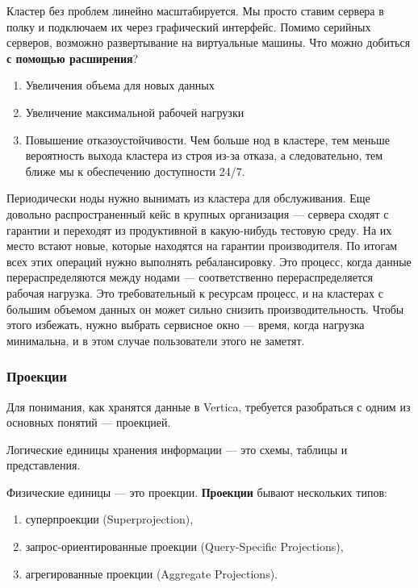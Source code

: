Кластер без проблем линейно масштабируется. Мы просто ставим сервера
в полку и
подключаем их через графический интерфейс. Помимо серийных серверов,
возможно развертывание на виртуальные машины. Что можно добиться \textbf{с помощью
расширения}?

\begin{enumerate}
	\item Увеличения объема для новых данных
	\item Увеличение максимальной рабочей нагрузки
	\item Повышение отказоустойчивости. Чем больше нод в кластере, тем меньше
	вероятность
	выхода кластера из строя из-за отказа, а следовательно, тем ближе мы к
	обеспечению
	доступности 24/7.
\end{enumerate}

Периодически ноды нужно вынимать из кластера для обслуживания. Еще
довольно
распространенный кейс в крупных организация — сервера сходят с
гарантии и переходят из продуктивной в какую-нибудь тестовую среду. На
их место встают новые, которые находятся на гарантии производителя. По
итогам всех этих операций нужно выполнять ребалансировку.
Это процесс, когда данные перераспределяются между нодами —
соответственно
перераспределяется рабочая нагрузка. Это требовательный к ресурсам
процесс, и на
кластерах с большим объемом данных он может сильно снизить
производительность. Чтобы этого избежать, нужно выбрать сервисное окно
— время, когда нагрузка минимальна, и в этом случае пользователи этого
не заметят.

\subsubsection{Проекции}

Для понимания, как хранятся данные в Vertica, требуется разобраться с
одним из основных понятий — проекцией.

Логические единицы хранения информации — это схемы, таблицы и
представления.

Физические единицы — это проекции. \textbf{Проекции} бывают нескольких типов:

\begin{enumerate}
	\item суперпроекции (Superprojection),
	\item запрос-ориентированные проекции (Query-Specific Projections),
	\item агрегированные проекции (Aggregate Projections).
\end{enumerate}


